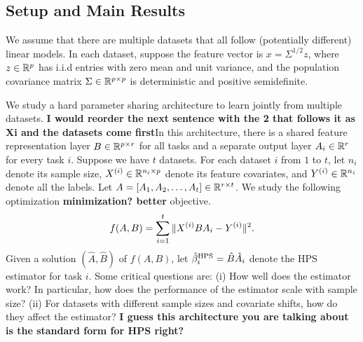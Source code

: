 \subsection{Setup and Main Results}

We assume that there are multiple datasets that all follow (potentially different) linear models.
In each dataset, suppose the feature vector is $x = {\Sigma}^{1/2} z$, where $z \in \mathbb{R}^p$ has i.i.d entries with zero mean and unit variance, and the population covariance matrix $\Sigma \in\mathbb{R}^{p \times p}$ is deterministic and positive semidefinite.


We study a hard parameter sharing architecture to learn jointly from multiple datasets.\textbf{
I would reorder the next sentence with the 2 that follows it as Xi and the datasets come first}In this architecture, there is a shared feature representation layer $B\in\mathbb{R}^{p\times r}$ for all tasks and a separate output layer $A_i \in \mathbb{R}^r$ for every task $i$.
Suppose we have $t$ datasets.
For each dataset $i$ from $1$ to $t$, let $n_i$ denote its sample size, $X^{(i)} \in \mathbb{R}^{n_i \times p}$ denote its feature covariates, and $Y^{(i)} \in \mathbb{R}^{n_i}$ denote all the labels.
Let $A = [A_1, A_2, \dots, A_t] \in \mathbb{R}^{r \times t}$.
We study the following optimization \textbf{minimization? better} objective.
\vspace{-0.1in}
\begin{align}\label{eq_mtl}
			f(A, B) = \sum_{i=1}^t \|X^{(i)} B A_i - Y^{(i)}\|^2.
\end{align}
Given a solution $(\hat{A}, \hat{B})$ of $f(A, B)$, let $\hat{\beta}_i^{\textup{HPS}} = \hat{B} \hat{A}_i$ denote the HPS estimator for task $i$.
Some critical questions are:
(i) How well does the estimator work? In particular, how does the performance of the estimator scale with sample size?
(ii) For datasets with different sample sizes and covariate shifts, how do they affect the estimator? \textbf{I guess this architecture you are talking about is the standard form for HPS right?}


